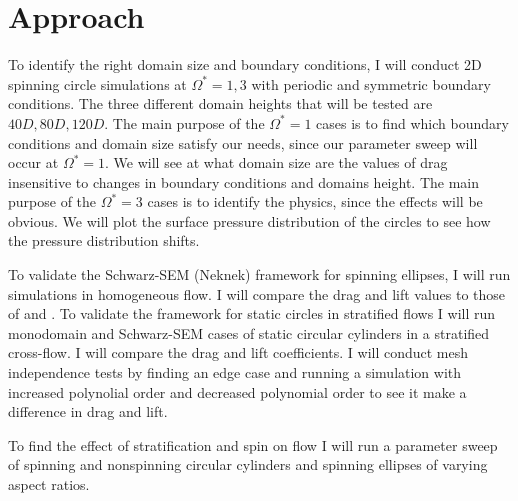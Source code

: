 \chapter{Approach}
\label{chp:Approach}
To identify the right domain size and boundary conditions, I will conduct 2D spinning circle simulations at $\Omega^{\ast} = 1, 3$ with periodic and symmetric boundary conditions. The three different domain heights that will be tested are $40D, 80D, 120D$. The main purpose of the $\Omega^{\ast}=1$ cases is to find which boundary conditions and domain size satisfy our needs, since our parameter sweep will occur at $\Omega^{\ast}=1$. We will see at what domain size are the values of drag insensitive to changes in boundary conditions and domains height. The main purpose of the $\Omega^{\ast}=3$ cases is to identify the physics, since the effects will be obvious. We will plot the surface pressure distribution of the circles to see how the pressure distribution shifts. 

To validate the Schwarz-SEM (Neknek) framework for spinning ellipses, I will run simulations in homogeneous flow. I will compare the drag and lift values to those of \cite{lu_flow_2018} and \cite{lua_rotating_2018}. To validate the framework for static circles in stratified flows I will run monodomain and Schwarz-SEM cases of static circular cylinders in a stratified cross-flow. I will compare the drag and lift coefficients. I will conduct mesh independence tests by finding an edge case and running a simulation with increased polynolial order and decreased polynomial order to see it make a difference in drag and lift. 

To find the effect of stratification and spin on flow I will run a parameter sweep of spinning and nonspinning circular cylinders and spinning ellipses of varying aspect ratios. 



